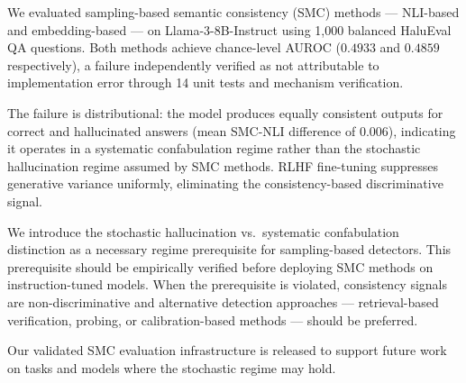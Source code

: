 We evaluated sampling-based semantic consistency (SMC) methods --- NLI-based and embedding-based --- on Llama-3-8B-Instruct using 1,000 balanced HaluEval QA questions. Both methods achieve chance-level AUROC ($0.4933$ and $0.4859$ respectively), a failure independently verified as not attributable to implementation error through 14 unit tests and mechanism verification.

The failure is distributional: the model produces equally consistent outputs for correct and hallucinated answers (mean SMC-NLI difference of $0.006$), indicating it operates in a systematic confabulation regime rather than the stochastic hallucination regime assumed by SMC methods. RLHF fine-tuning suppresses generative variance uniformly, eliminating the consistency-based discriminative signal.

We introduce the stochastic hallucination vs.\ systematic confabulation distinction as a necessary regime prerequisite for sampling-based detectors. This prerequisite should be empirically verified before deploying SMC methods on instruction-tuned models. When the prerequisite is violated, consistency signals are non-discriminative and alternative detection approaches --- retrieval-based verification, probing, or calibration-based methods --- should be preferred.

Our validated SMC evaluation infrastructure is released to support future work on tasks and models where the stochastic regime may hold.
